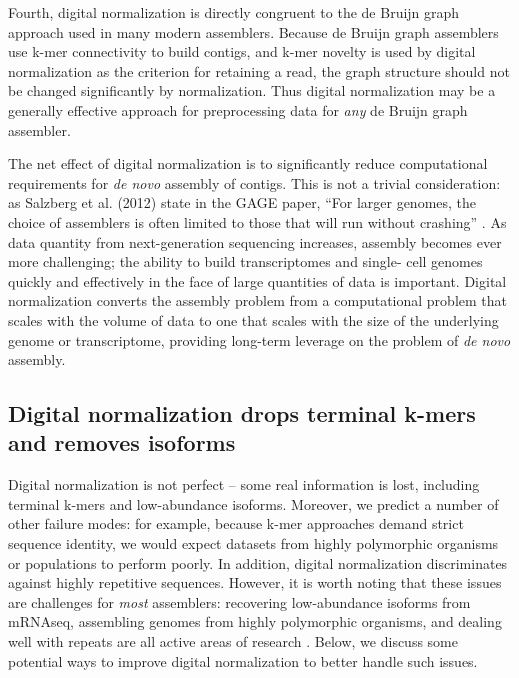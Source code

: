 \documentclass[10pt]{article}
\begin{document}
Fourth, digital normalization is directly congruent to the de Bruijn
graph approach used in many modern assemblers.  Because de Bruijn
graph assemblers use k-mer connectivity to build contigs, and k-mer
novelty is used by digital normalization as the criterion for
retaining a read, the graph structure should not be changed
significantly by normalization.  Thus digital
normalization may be a generally effective approach for preprocessing
data for {\em any} de Bruijn graph assembler.


The net effect of digital normalization is to significantly reduce
computational requirements for {\em de novo} assembly of contigs.  This is not a
trivial consideration: as Salzberg et al. (2012) state in the GAGE
paper, ``For larger genomes, the choice of assemblers is often limited
to those that will run without crashing'' \cite{pubmed22147368}.  As
data quantity from next-generation sequencing increases, assembly
becomes ever more challenging; the ability to build transcriptomes and
single- cell genomes quickly and effectively in the face of large
quantities of data is important.  Digital normalization
converts the assembly problem from a computational problem that scales
with the volume of data to one that scales with
the size of the underlying genome or transcriptome, providing long-term
leverage on the problem of {\em de novo} assembly.


\subsection*{Digital normalization drops terminal k-mers and removes isoforms}

Digital normalization is not perfect -- some real information is lost,
including terminal k-mers and low-abundance isoforms.  Moreover, we
predict a number of other failure modes: for example, because k-mer approaches
demand strict sequence identity, we would expect datasets from highly
polymorphic organisms or populations to perform poorly.  In addition,
digital normalization discriminates against highly repetitive
sequences.  However, it is worth noting that these issues are
challenges for {\em most} assemblers: recovering low-abundance isoforms from
mRNAseq, assembling genomes from highly polymorphic organisms, and
dealing well with repeats are all active areas of research \cite{pubmed18549302,pubmed20633259,pubmed18541131}.  Below, we discuss some potential ways to improve digital
normalization to better handle such issues.
\end{document}
